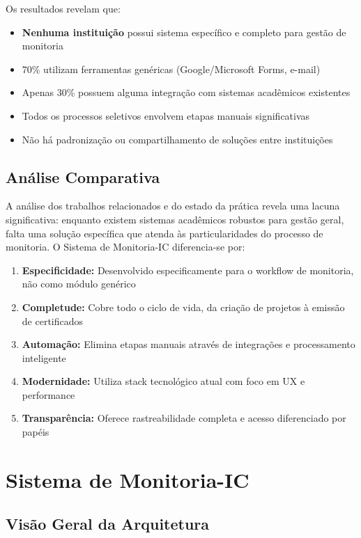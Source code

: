 \documentclass[portuguese]{sbc2025}%
\begin{document}
Os resultados revelam que:
\begin{itemize}
  \item \textbf{Nenhuma instituição} possui sistema específico e completo para gestão de monitoria
  \item 70\% utilizam ferramentas genéricas (Google/Microsoft Forms, e-mail)
  \item Apenas 30\% possuem alguma integração com sistemas acadêmicos existentes
  \item Todos os processos seletivos envolvem etapas manuais significativas
  \item Não há padronização ou compartilhamento de soluções entre instituições
\end{itemize}

\subsection{Análise Comparativa}

A análise dos trabalhos relacionados e do estado da prática revela uma lacuna significativa: enquanto existem sistemas acadêmicos robustos para gestão geral, falta uma solução específica que atenda às particularidades do processo de monitoria. O Sistema de Monitoria-IC diferencia-se por:

\begin{enumerate}
  \item \textbf{Especificidade:} Desenvolvido especificamente para o workflow de monitoria, não como módulo genérico
  \item \textbf{Completude:} Cobre todo o ciclo de vida, da criação de projetos à emissão de certificados
  \item \textbf{Automação:} Elimina etapas manuais através de integrações e processamento inteligente
  \item \textbf{Modernidade:} Utiliza stack tecnológico atual com foco em UX e performance
  \item \textbf{Transparência:} Oferece rastreabilidade completa e acesso diferenciado por papéis
\end{enumerate}

\section{Sistema de Monitoria-IC}
\label{sec:system}

\subsection{Visão Geral da Arquitetura}
\end{document}
